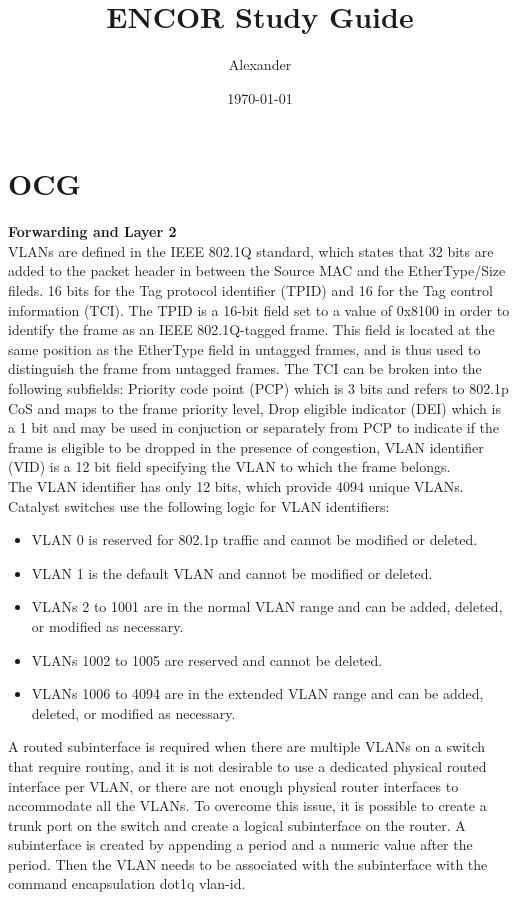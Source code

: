 \documentclass{article}
\title{ENCOR Study Guide}
\author{Alexander}
\date{\today}
\begin{document}
\maketitle

\section*{OCG}

\noindent\textbf{Forwarding and Layer 2}\\

	VLANs are defined in the IEEE 802.1Q standard, which states that 32 bits are added to the packet header in between the Source MAC and the EtherType/Size fileds. 16 bits for the Tag protocol identifier (TPID) and 16 for the Tag control information (TCI). The TPID is a 16-bit field set to a value of 0x8100 in order to identify the frame as an IEEE 802.1Q-tagged frame. This field is located at the same position as the EtherType field in untagged frames, and is thus used to distinguish the frame from untagged frames. The TCI can be broken into the following subfields: Priority code point (PCP) which is 3 bits and refers to 802.1p CoS and maps to the frame priority level, Drop eligible indicator (DEI) which is a 1 bit and may be used in conjuction or separately from PCP to indicate if the frame is eligible to be dropped in the presence of congestion, VLAN identifier (VID) is a 12 bit field specifying the VLAN to which the frame belongs.\\

	The VLAN identifier has only 12 bits, which provide 4094 unique VLANs. Catalyst switches use the following logic for VLAN identifiers:
\begin{itemize}
\item VLAN 0 is reserved for 802.1p traffic and cannot be modified or deleted.
\item VLAN 1 is the default VLAN and cannot be modified or deleted.
\item VLANs 2 to 1001 are in the normal VLAN range and can be added, deleted, or modified as necessary.
\item VLANs 1002 to 1005 are reserved and cannot be deleted.
\item VLANs 1006 to 4094 are in the extended VLAN range and can be added, deleted, or modified as necessary.
\end{itemize}

	A routed subinterface is required when there are multiple VLANs on a switch that require routing, and it is not desirable to use a dedicated physical routed interface per VLAN, or there are not enough physical router interfaces to accommodate all the VLANs. To overcome this issue, it is possible to create a trunk port on the switch and create a logical subinterface on the router. A subinterface is created by appending a period and a numeric value after the period. Then the VLAN needs to be associated with the subinterface with the command encapsulation dot1q vlan-id.\\
\end{document}
